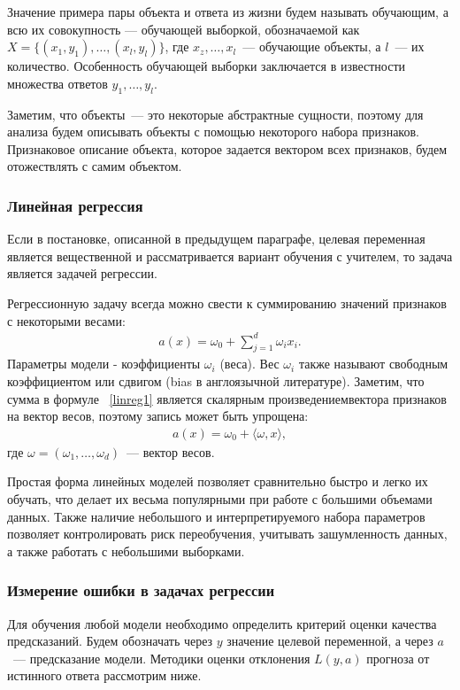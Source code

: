 \documentclass[12pt,a4paper]{article} %
\begin{document}
Значение примера пары объекта и ответа из жизни будем называть обучающим, а всю их совокупность --- обучающей выборкой, обозначаемой как $X = \{(x_1, y_1), \dots, (x_l, y_l)\}$, где $x_z, \dots, x_l$~--- обучающие объекты, а $l$~--- их количество. Особенность обучающей выборки заключается в известности множества ответов $y_1,\dots,y_l$.

Заметим, что объекты~--- это некоторые абстрактные сущности, поэтому для анализа будем описывать объекты с помощью некоторого набора признаков. Признаковое описание объекта, которое задается вектором всех признаков, будем отожествлять с самим объектом.

\subsubsection{Линейная регрессия}

Если в постановке, описанной в предыдущем параграфе, целевая переменная является вещественной и рассматривается вариант обучения с учителем, то задача является задачей регрессии.

Регрессионную задачу всегда можно свести к суммированию значений признаков с некоторыми весами:
\begin{gather}\label{linreg1}
	a(x) = \omega_0 + \sum\limits_{j=1}^{d} \omega_i x_i.
\end{gather}
Параметры модели - коэффициенты $\omega_i$ (веса). Вес $\omega_i$ также называют свободным коэффициентом или сдвигом (bias в англоязычной литературе). Заметим, что сумма в формуле ~\ref{linreg1} является скалярным произведениемвектора признаков на вектор весов, поэтому запись может быть упрощена:
\begin{gather}\label{linreg2}
	 a(x) = \omega_0 + \langle \omega, x\rangle,
\end{gather}
где $\omega = (\omega_1,\dots,\omega_d)$~--- вектор весов.

Простая форма линейных моделей позволяет сравнительно быстро и легко их обучать, что делает их весьма популярными при работе с большими объемами данных. Также наличие небольшого и интерпретируемого набора параметров позволяет контролировать риск переобучения, учитывать зашумленность данных, а также работать с небольшими выборками.

\subsubsection{Измерение ошибки в задачах регрессии}

Для обучения любой модели необходимо определить критерий оценки качества предсказаний. Будем обозначать через $y$ значение целевой переменной, а через $a$~--- предсказание модели. Методики оценки отклонения $L(y,a)$ прогноза от истинного ответа рассмотрим ниже.
\end{document}
